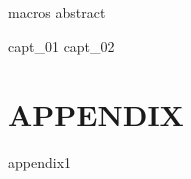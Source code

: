 \documentclass[12pt,oneside,english]{book}
\begin{document}




\runfrontend{}

{macros}
{abstract}

\sumario

\listadefiguras

\listadetabelas


	\listadesimbolos

	\listadeacronimos

	\listadenotacoes

\markboth{}{}

\mainmatter 
\setcounter{page}{1} \pagestyle{plain} 

{capt_01}
{capt_02}



%
% 
%


\part*{APPENDIX}
\appendix
{appendix1}
\end{document}
